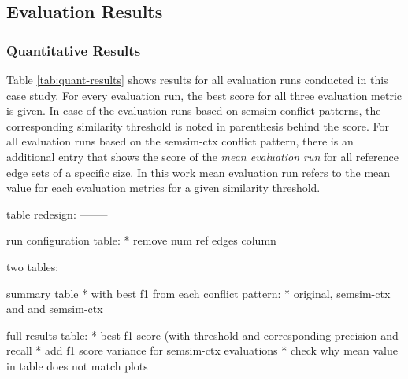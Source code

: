 \documentclass[11pt]{scrreprt}
\begin{document}
\subsection{Evaluation Results}

\subsubsection{Quantitative Results}
Table \cref{tab:quant-results} shows results for all evaluation runs conducted in this case study. For every evaluation run, the best score for all three evaluation metric is given. In case of the evaluation runs based on semsim conflict patterns, the corresponding similarity threshold is noted in parenthesis behind the score. For all evaluation runs based on the semsim-ctx conflict pattern, there is an additional entry that shows the score of the \textit{mean evaluation run} for all reference edge sets of a specific size. In this work mean evaluation run refers to the mean value for each evaluation metrics for a given similarity threshold.


table redesign:
--------

run configuration table:
* remove num ref edges column




two tables:

summary table 
* with best f1 from each conflict pattern: 
* original, semsim-ctx and  and semsim-ctx


full results table:
 * best f1 score (with threshold and corresponding precision and recall
 * add f1 score variance for semsim-ctx evaluations
 * check why mean value in table does not match plots
 
 
\end{document}
